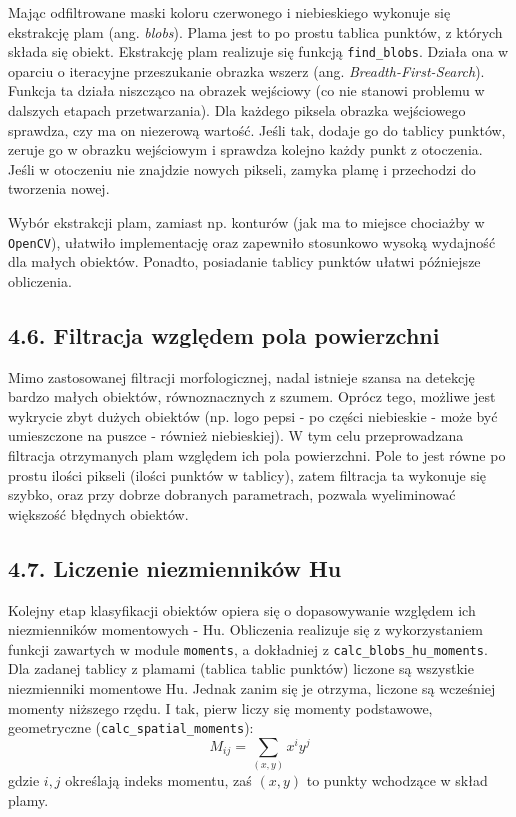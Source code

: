 \documentclass[11pt,a4paper,twoside]{report}
\begin{document}
			Mając odfiltrowane maski koloru czerwonego i niebieskiego wykonuje się ekstrakcję plam (ang. \emph{blobs}). Plama jest to po prostu tablica punktów, z których składa się obiekt. Ekstrakcję plam realizuje się funkcją \texttt{find\_blobs}. Działa ona w oparciu o iteracyjne przeszukanie obrazka wszerz (ang. \emph{Breadth-First-Search}). Funkcja ta działa niszcząco na obrazek wejściowy (co nie stanowi problemu w dalszych etapach przetwarzania). Dla każdego piksela obrazka wejściowego sprawdza, czy ma on niezerową wartość. Jeśli tak, dodaje go do tablicy punktów, zeruje go w obrazku wejściowym i sprawdza kolejno każdy punkt z otoczenia. Jeśli w otoczeniu nie znajdzie nowych pikseli, zamyka plamę i przechodzi do tworzenia nowej.

			Wybór ekstrakcji plam, zamiast np. konturów (jak ma to miejsce chociażby w \texttt{OpenCV}), ułatwiło implementację oraz zapewniło stosunkowo wysoką wydajność dla małych obiektów. Ponadto, posiadanie tablicy punktów ułatwi późniejsze obliczenia.

	\subsection*{4.6. Filtracja względem pola powierzchni}

			Mimo zastosowanej filtracji morfologicznej, nadal istnieje szansa na detekcję bardzo małych obiektów, równoznacznych z szumem. Oprócz tego, możliwe jest wykrycie zbyt dużych obiektów (np. logo pepsi - po części niebieskie - może być umieszczone na puszce - również niebieskiej). W tym celu przeprowadzana filtracja otrzymanych plam względem ich pola powierzchni. Pole to jest równe po prostu ilości pikseli (ilości punktów w tablicy), zatem filtracja ta wykonuje się szybko, oraz przy dobrze dobranych parametrach, pozwala wyeliminować większość błędnych obiektów.

	\subsection*{4.7. Liczenie niezmienników Hu}

			Kolejny etap klasyfikacji obiektów opiera się o dopasowywanie względem ich niezmienników momentowych - Hu. Obliczenia realizuje się z wykorzystaniem funkcji zawartych w module \texttt{moments}, a dokładniej z \texttt{calc\_blobs\_hu\_moments}. Dla zadanej tablicy z plamami (tablica tablic punktów) liczone są wszystkie niezmienniki momentowe Hu. Jednak zanim się je otrzyma, liczone są wcześniej momenty niższego rzędu. I tak, pierw liczy się momenty podstawowe, geometryczne (\texttt{calc\_spatial\_moments}):
			\[
				M_{ij} = \sum_{(x,y)} x^i y^j
			\]
			gdzie $i, j$ określają indeks momentu, zaś $(x, y)$ to punkty wchodzące w skład plamy.
\end{document}
